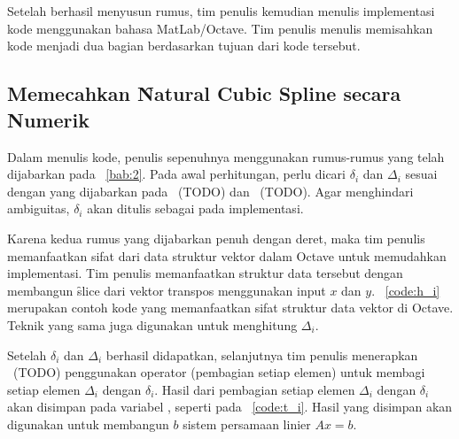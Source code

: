 \chapter{\babTiga}
\label{bab:3}
Setelah berhasil menyusun rumus, tim penulis kemudian menulis implementasi kode menggunakan
bahasa MatLab/Octave. Tim penulis menulis memisahkan kode menjadi dua bagian berdasarkan
tujuan dari kode tersebut.


\section{Memecahkan \f{Natural Cubic Spline} secara Numerik}
\label{sec:numericCubicSpline}
Dalam menulis kode, penulis sepenuhnya menggunakan rumus-rumus yang telah dijabarkan pada
\bab~\ref{bab:2}. Pada awal perhitungan, perlu dicari $\delta_i$ dan $\Delta_i$
sesuai dengan yang dijabarkan pada \equ~(TODO) dan \equ~(TODO). Agar menghindari
ambiguitas, $\delta_i$ akan ditulis sebagai  pada implementasi.

Karena kedua rumus yang dijabarkan penuh dengan deret, maka tim penulis
memanfaatkan sifat dari data struktur vektor dalam Octave untuk memudahkan
implementasi. Tim penulis memanfaatkan struktur data tersebut dengan membangun
\f{slice} dari vektor transpos menggunakan input $x$ dan $y$. \lst~\ref{code:h_i}
merupakan contoh kode yang memanfaatkan sifat struktur data vektor di Octave.
Teknik yang sama juga digunakan untuk menghitung $\Delta_i$.



Setelah $\delta_i$ dan $\Delta_i$ berhasil didapatkan, selanjutnya tim penulis
menerapkan \equ~(TODO) penggunakan operator  (pembagian setiap elemen)
untuk membagi setiap elemen $\Delta_i$ dengan $\delta_i$. Hasil dari pembagian
setiap elemen $\Delta_i$ dengan $\delta_i$ akan disimpan pada variabel ,
seperti pada \lst~\ref{code:t_i}. Hasil yang disimpan akan digunakan untuk
membangun $b$ sistem persamaan linier $A x = b$.




